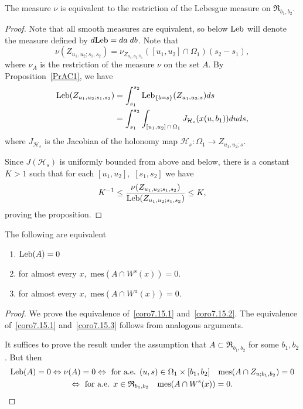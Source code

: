 \documentclass[10pt]{amsart}
\theoremstyle{definition}\newtheorem{defi}[theo]{Definition}\newtheorem{rema}[theo]{Remark}\newtheorem{exam}[theo]{Example}\newtheorem{exem}[theo]{Example}\newtheorem{nota}[theo]{Notation}
\newcommand{\inv}{^{-1}}
\newcommand{\unstable}{\text{u}}
\newcommand{\stable}{\text{s}}
\newcommand{\mes}{{\mathrm{mes}}}
\newcommand{\Rect}{{\mathfrak{R}}}
\newcommand{\hol}{\mathcal{H}}
\newcommand{\Ws}{W^{\stable}}
\newcommand{\Wu}{W^{\unstable}}
\newcommand{\Leb}{\textup{Leb}}
\newcommand*{\relabel}{\renewcommand{\labelenumi}{(\theenumi)}}
\newcommand*{\alphenumi}{\renewcommand*{\theenumi}{\alph{enumi}}\relabel}
\begin{document}
\begin{prop}\label{PrAC2}
The measure $\nu$ is equivalent to the restriction of the Lebesgue measure on $\Rect_{b_1, b_2}.$
\end{prop}
\begin{proof}
Note that all smooth measures are equivalent, so below $\Leb$ will denote the measure defined by $d\Leb=da\; db$. Note that
\[
\nu(Z_{u_1, u_2; s_1, s_2})= \nu_{Z_{u_{1},u_{2};b_{1}}}([u_1,
u_2]\cap \Omega_1) (s_2-s_1),
\]
where $\nu_{A}$ is the
restriction of the measure $\nu$ on the set $A$. By Proposition~\ref{PrAC1}, we have
\begin{align*}
\Leb(Z_{u_1,u_2; s_1, s_2}) &=\int _{s_1}^{s_2} \Leb_{\{b = s\}}(Z_{u_1, u_2; s}) ds\\
&=\int_{s_1}^{s_2} \int_{[u_1, u_2]\,\cap\,\Omega_1} J_{\hol_s}(x(u, b_1)) du ds,
\end{align*}
where $J_{\hol_s}$ is the Jacobian of the holonomy map $\hol_s: \Omega_1\to Z_{u_1, u_2; s}$.

Since $J(\hol_s)$ is uniformly bounded from above and below, there is a constant $K > 1$ such that for each $[u_1, u_2],$ $[s_1, s_2]$ we have
\begin{align*}
{K}\inv\leq \frac{\nu(Z_{u_1, u_2; s_1, s_2})}{ \Leb(Z_{u_1, u_2; s_1, s_2})}\leq K,
\end{align*}
proving the proposition.
\end{proof}
\begin{coro}\label{AC1-AC2}
The following are equivalent
\begin{enumerate}\alphenumi
\item\label{coro7.15.1} $\Leb(A)=0$
\item\label{coro7.15.2} for almost every $x,$ $\mes(A\cap \Ws(x))=0.$
\item\label{coro7.15.3} for almost every $x,$ $\mes(A\cap \Wu(x))=0.$
\end{enumerate}
\end{coro}
\begin{proof}
We prove the equivalence of~\eqref{coro7.15.1} and~\eqref{coro7.15.2}. The equivalence of~\eqref{coro7.15.1} and~\eqref{coro7.15.3} follows from analogous arguments.

It suffices to prove the result under the assumption that $A\subset \Rect_{b_1, b_2}$ for some $b_1, b_2$. But then
\begin{gather*}
\Leb(A)=0\Leftrightarrow \nu(A)=0
\Leftrightarrow \text{ for a.e. }(u, s) \in\Omega_1\times [b_1, b_2] \quad \mes(A\cap
Z_{u; b_1, b_2})=0
\\
\Leftrightarrow \text{ for a.e. }x\in \Rect_{b_1, b_2} \quad \mes(A\cap \Ws(x))=0. \qedhere
\end{gather*}
\end{proof}
\end{document}
